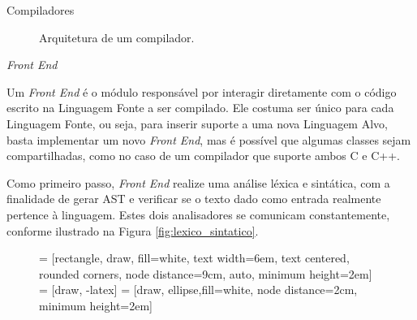 \begin{section}{Compiladores}
\begin{figure}
\begin{center}
{
}
\end{center}

\caption{Arquitetura de um compilador.}
\label{fig:compiler_arch}
\end{figure}

\begin{subsection}{\textit{Front End}}

Um \textit{Front End} é o módulo responsável por interagir diretamente com o
código escrito na Linguagem Fonte a ser compilado. Ele costuma ser único
para cada Linguagem Fonte, ou seja, para inserir suporte a uma nova
Linguagem Alvo, basta implementar um novo \textit{Front End}, mas é 
possível que algumas classes sejam
compartilhadas, como no caso de um compilador que suporte ambos C e C++. 


Como primeiro passo, \textit {Front End} realize uma análise
léxica e sintática, com a finalidade de gerar AST e verificar
se o texto dado como entrada realmente pertence à linguagem.
Estes dois analisadores se comunicam constantemente, conforme ilustrado na Figura
\ref{fig:lexico_sintatico}.


\begin{figure}
 = [rectangle, draw, fill=white,
    text width=6em, text centered, rounded corners, node distance=9cm, auto, minimum height=2em]
 = [draw, -latex]
 = [draw, ellipse,fill=white, node distance=2cm,
    minimum height=2em]

\begin{center}
\end{center}
\end{figure}
\end{subsection}
\end{section}

